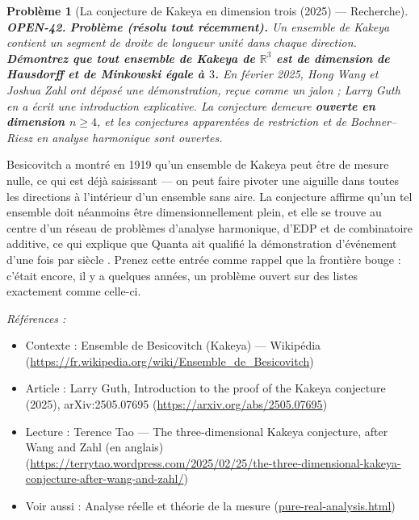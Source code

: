 \documentclass[11pt]{article}
\newtheorem{problem}{Problème}
\newenvironment{refs}{\par\small\noindent\emph{Références :}\begin{itemize}\setlength\itemsep{0pt}}{\end{itemize}\normalsize}
\begin{document}
\bigskip

\begin{problem}[{La conjecture de Kakeya en dimension trois (2025) --- Recherche}]
\textbf{OPEN-42.} \textbf{Problème (résolu tout récemment).} Un ensemble de Kakeya
contient un segment de droite de longueur unité dans chaque direction. \textbf{Démontrez que
tout ensemble de Kakeya de $ \mathbb{R}^3 $ est de dimension de Hausdorff et de
Minkowski égale à $ 3 $.} En février 2025, Hong Wang et Joshua Zahl ont déposé une
démonstration, reçue comme un jalon ; Larry Guth en a écrit une introduction explicative.
La conjecture demeure \textbf{ouverte en dimension $ n \geq 4 $}, et les conjectures
apparentées de restriction et de Bochner--Riesz en analyse harmonique sont ouvertes.
\end{problem}

\noindent Besicovitch a montré en 1919 qu'un ensemble de Kakeya peut être de
mesure nulle, ce qui est déjà saisissant --- on peut faire pivoter une aiguille dans toutes
les directions à l'intérieur d'un ensemble sans aire. La conjecture affirme qu'un tel
ensemble doit néanmoins être dimensionnellement plein, et elle se trouve au centre d'un
réseau de problèmes d'analyse harmonique, d'EDP et de combinatoire additive, ce qui
explique que Quanta ait qualifié la démonstration d'événement \og{} d'une fois par siècle \fg{}.
Prenez cette entrée comme rappel que la frontière bouge : c'était encore, il y a quelques
années, un problème ouvert sur des listes exactement comme celle-ci.

\begin{refs}
\item Contexte : Ensemble de Besicovitch (Kakeya) --- Wikipédia (\url{https://fr.wikipedia.org/wiki/Ensemble_de_Besicovitch})
\item Article : Larry Guth, \og{} Introduction to the proof of the Kakeya conjecture \fg{} (2025), arXiv:2505.07695 (\url{https://arxiv.org/abs/2505.07695})
\item Lecture : Terence Tao --- The three-dimensional Kakeya conjecture, after Wang and Zahl (en anglais) (\url{https://terrytao.wordpress.com/2025/02/25/the-three-dimensional-kakeya-conjecture-after-wang-and-zahl/})
\item Voir aussi : Analyse réelle et théorie de la mesure (\url{pure-real-analysis.html})
\end{refs}

\bigskip
\end{document}
